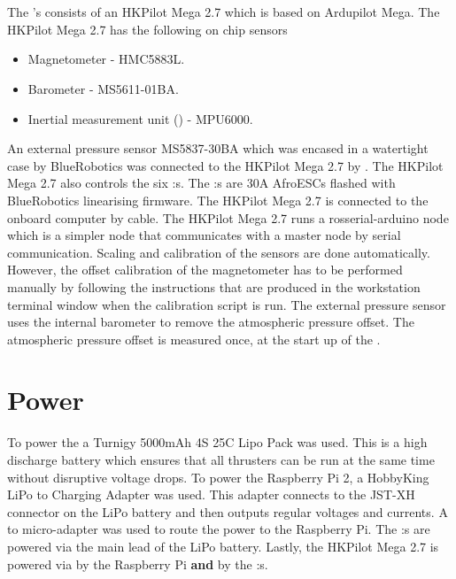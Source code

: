 \section{\abbrROV \abbrIO}
The \abbrROV's \abbrIO consists of an HKPilot Mega 2.7 which is based on Ardupilot Mega. The HKPilot Mega 2.7 has the following on chip sensors
\begin{itemize}
    \item Magnetometer - HMC5883L.
    \item Barometer - MS5611-01BA.
    \item Inertial measurement unit (\abbrIMU) - MPU6000.
\end{itemize}
An external pressure sensor MS5837-30BA which was encased in a watertight case by BlueRobotics was connected to the HKPilot Mega 2.7 by \abbrIC.
The HKPilot Mega 2.7 also controls the six \abbrESC:s. The \abbrESC:s are 30A AfroESCs flashed with BlueRobotics linearising firmware. The HKPilot Mega 2.7 is connected to the onboard computer by \abbrUSB cable. The HKPilot Mega 2.7 runs a rosserial-arduino node which is a simpler \abbrROS node that communicates with a master node by serial communication. Scaling and calibration of the sensors are done automatically. However, the offset calibration of the magnetometer has to be performed manually by following the instructions that are produced in the workstation terminal window when the calibration script is run. The external pressure sensor uses the internal barometer to remove the atmospheric pressure offset. The atmospheric pressure offset is measured once, at the start up of the \abbrROV.

\section{Power}
To power the \abbrROV a Turnigy 5000mAh 4S 25C Lipo Pack was used. This is a high discharge battery which ensures that all thrusters can be run at the same time without disruptive voltage drops.
To power the Raspberry Pi 2, a HobbyKing LiPo to \abbrUSB Charging Adapter was used. This adapter connects to the JST-XH connector on the LiPo battery and then outputs regular \abbrUSB voltages and currents. A \abbrUSB to micro-\abbrUSB adapter was used to route the power to the Raspberry Pi. 
The \abbrESC:s are powered via the main lead of the LiPo battery. Lastly, the HKPilot Mega 2.7 is powered via \abbrUSB by the Raspberry Pi \textbf{and} by the \abbrESC:s. 

